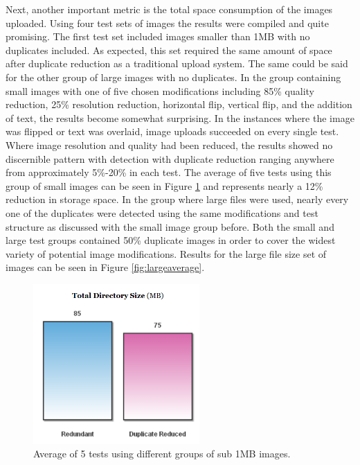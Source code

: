 Next, another important metric is the total space consumption of the images uploaded. Using four test sets of images the results were compiled and quite promising. The first test set included images smaller than 1MB with no duplicates included. As expected, this set required the same amount of space after duplicate reduction as a traditional upload system. The same could be said for the other group of large images with no duplicates. In the group containing small images with one of five chosen modifications including 85\% quality reduction, 25\% resolution reduction, horizontal flip, vertical flip, and the addition of text, the results become somewhat surprising. In the instances where the image was flipped or text was overlaid, image uploads succeeded on every single test. Where image resolution and quality had been reduced, the results showed no discernible pattern with detection with duplicate reduction ranging anywhere from approximately 5\%-20\% in each test. The average of five tests using this group of small images can be seen in Figure \ref{fig:smallaverage} and represents nearly a 12\% reduction in storage space. In the group where large files were used, nearly every one of the duplicates were detected using the same modifications and test structure as discussed with the small image group before. Both the small and large test groups contained 50\% duplicate images in order to cover the widest variety of potential image modifications. Results for the large file size set of images can be seen in Figure \ref{fig:largeaverage}.

\begin{figure}[htbp]
\centering
\includegraphics[width=2.5in]{smallaverage}
\caption{Average of 5 tests using different groups of sub 1MB images.}
\label{fig:smallaverage}
\end{figure}

